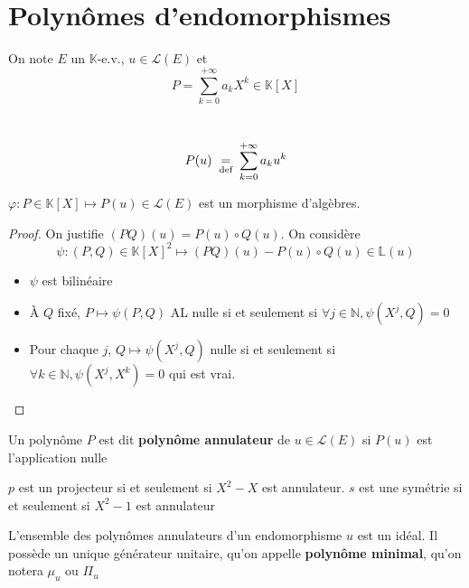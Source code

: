 \section{Polynômes d'endomorphismes}

\begin{defprop}
    \Hyp On note $E$ un $\mathbb K$-e.v., $u\in\mathcal L(E)$ et \[
        P=\sum_{k=0}^{+\infty}a_kX^k\in\mathbb K[X]
    \]
    \begin{concenum}
    \item ~ \[
            P(u)\;\underset{\text{def}}=\;\sum_{k=0}^{+\infty} a_ku^k
        \]
    \item $\varphi: P\in\mathbb K[X]\longmapsto P(u)\in\mathcal L(E)$ est un morphisme d'algèbres.
    \end{concenum}
\end{defprop}

\begin{proof}
    On justifie $(PQ)(u)=P(u)\circ Q(u)$. On considère \[
        \psi: (P, Q)\in\mathbb K[X]^2\longmapsto (PQ)(u)-P(u)\circ Q(u)\in\mathbb L(u)
    \]
    \begin{itemize}
        \item $\psi$ est bilinéaire
        \item À $Q$ fixé, $P\longmapsto \psi(P, Q)$ AL nulle si et seulement si $\forall j\in\mathbb N, \psi(X^j, Q)=0$
        \item Pour chaque $j$, $Q\longmapsto \psi(X^j, Q)$ nulle si et seulement si $\forall k\in\mathbb N, \psi(X^j, X^k)=0$ qui est vrai.
    \end{itemize}
\end{proof}

\begin{dfn}
    Un polynôme $P$ est dit \textbf{polynôme annulateur} de $u\in\mathcal L(E)$ si $P(u)$ est l'application nulle
\end{dfn}

\begin{ex}
    $p$ est un projecteur si et seulement si $X^2-X$ est annulateur. $s$ est une symétrie si et seulement si $X^2-1$ est annulateur
\end{ex}

\begin{defprop}
    L'ensemble des polynômes annulateurs d'un endomorphisme $u$ est un idéal. Il possède un unique générateur unitaire, qu'on appelle \textbf{polynôme minimal}, qu'on notera $\mu_u$ ou $\Pi_u$
\end{defprop}

